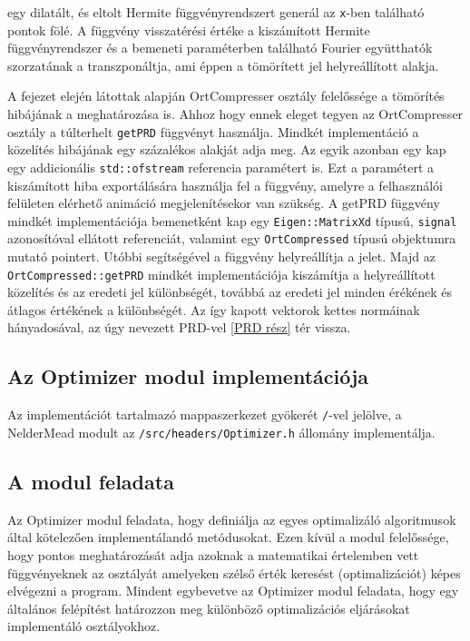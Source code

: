 \documentclass[oneside,titlepage,12pt,a4paper]{report}
\begin{document}
 egy dilatált, és eltolt Hermite függvényrendszert generál az \texttt{x}-ben található pontok fölé. A függvény visszatérési értéke a kiszámított Hermite függvényrendszer és a bemeneti paraméterben található Fourier együtthatók szorzatának a transzponáltja, ami éppen a tömörített jel helyreállított alakja.
\par A fejezet elején látottak alapján OrtCompresser osztály felelőssége a tömörítés hibájának a meghatározása is. Ahhoz hogy ennek eleget tegyen az OrtCompresser osztály a túlterhelt \texttt{getPRD} függvényt használja. Mindkét implementáció a közelítés hibájának egy százalékos alakját adja meg. Az egyik azonban egy kap egy addicionális \texttt{std::ofstream} referencia paramétert is. Ezt a paramétert a kiszámított hiba exportálására használja fel a függvény, amelyre a felhasználói felületen elérhető animáció megjelenítésekor van szükség. A getPRD függvény mindkét implementációja bemenetként kap egy \texttt{Eigen::MatrixXd} típusú, \texttt{signal} azonosítóval ellátott referenciát,  valamint egy \texttt{OrtCompressed} típusú objektumra mutató pointert. Utóbbi segítségével a függvény helyreállítja a jelet. Majd az \texttt{OrtCompressed::getPRD} mindkét implementációja kiszámítja a helyreállított közelítés és az eredeti jel különbségét, továbbá az eredeti jel minden érékének és átlagos értékének a különbségét. Az így kapott vektorok kettes normáinak hányadosával, az úgy nevezett PRD-vel \ref{PRD rész} tér vissza.

\subsection{Az Optimizer modul implementációja}

Az implementációt tartalmazó mappaszerkezet gyökerét \texttt{/}-vel jelölve, a NelderMead modult  az \texttt{/src/headers/Optimizer.h} állomány implementálja.

\subsection*{A modul feladata}

\par Az Optimizer modul feladata, hogy definiálja az egyes optimalizáló algoritmusok által kötelezően implementálandó metódusokat. Ezen kívül a modul felelőssége, hogy pontos meghatározását adja azoknak a matematikai értelemben vett függvényeknek az osztályát amelyeken szélső érték keresést (optimalizációt) képes elvégezni a program. Mindent egybevetve az Optimizer modul feladata, hogy egy általános felépítést határozzon meg különböző optimalizációs eljárásokat implementáló osztályokhoz. 
\end{document}
